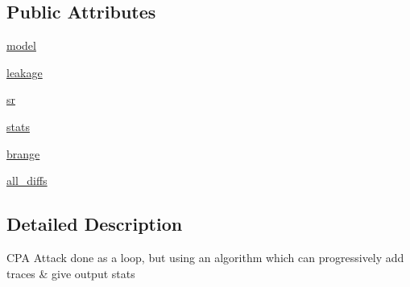 \subsection*{Public Attributes}
\begin{DoxyCompactItemize}
\item 
\hyperlink{classsoftware_1_1chipwhisperer_1_1analyzer_1_1attacks_1_1cpa__algorithms_1_1progressive__caccel_1_1CPAProgressive__CAccel_a964c4e82ecc2fddc3bdd7836ee1146fa}{model}
\item 
\hyperlink{classsoftware_1_1chipwhisperer_1_1analyzer_1_1attacks_1_1cpa__algorithms_1_1progressive__caccel_1_1CPAProgressive__CAccel_aa6611e610a6298213394c8582dea50e5}{leakage}
\item 
\hyperlink{classsoftware_1_1chipwhisperer_1_1analyzer_1_1attacks_1_1cpa__algorithms_1_1progressive__caccel_1_1CPAProgressive__CAccel_a666be788c7eaea5a2be75912288d763e}{sr}
\item 
\hyperlink{classsoftware_1_1chipwhisperer_1_1analyzer_1_1attacks_1_1cpa__algorithms_1_1progressive__caccel_1_1CPAProgressive__CAccel_a9669a367b7ef01f897e7aa1f62d8381d}{stats}
\item 
\hyperlink{classsoftware_1_1chipwhisperer_1_1analyzer_1_1attacks_1_1cpa__algorithms_1_1progressive__caccel_1_1CPAProgressive__CAccel_a11fa06dd5d4fb9ad43dfd86c99d4bc9c}{brange}
\item 
\hyperlink{classsoftware_1_1chipwhisperer_1_1analyzer_1_1attacks_1_1cpa__algorithms_1_1progressive__caccel_1_1CPAProgressive__CAccel_a4e9d37e4a284dc33de07bc3c89a1c0a7}{all\+\_\+diffs}
\end{DoxyCompactItemize}


\subsection{Detailed Description}
\begin{DoxyVerb}CPA Attack done as a loop, but using an algorithm which can progressively add traces & give output stats
\end{DoxyVerb}
 

